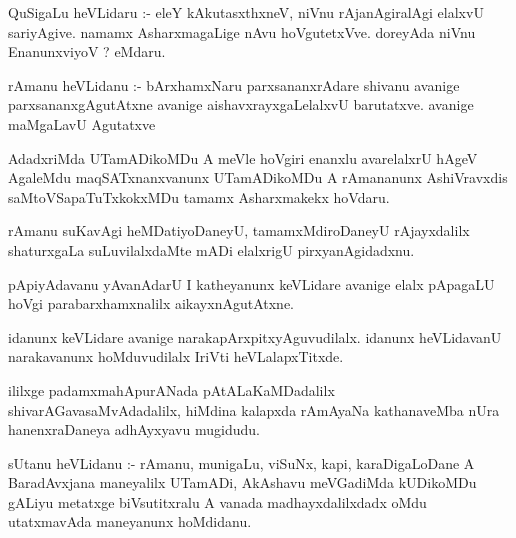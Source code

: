 \documentclass{article}
\begin{document}
\begin{mn}
QuSigaLu  heVLidaru :- eleY  kAkutasxthxneV,  niVnu  rAjanAgiralAgi  elalxvU  sariyAgive.  namamx  AsharxmagaLige  nAvu  hoVgutetxVve.  
doreyAda  niVnu  EnanunxviyoV ?  eMdaru.
\end{mn}

\begin{mn}
rAmanu  heVLidanu :- bArxhamxNaru  parxsananxrAdare  shivanu  avanige  parxsananxgAgutAtxne  avanige  aishavxrayxgaLelalxvU  barutatxve.  
avanige  maMgaLavU  Agutatxve
\end{mn}

\begin{mn}
AdadxriMda  UTamADikoMDu  A  meVle  hoVgiri  enanxlu  avarelalxrU  hAgeV  AgaleMdu  maqSATxnanxvanunx  UTamADikoMDu  A  rAmananunx  
AshiVravxdis  saMtoVSapaTuTxkokxMDu  tamamx  Asharxmakekx  hoVdaru.
\end{mn}

\begin{mn}
rAmanu  suKavAgi  heMDatiyoDaneyU,  tamamxMdiroDaneyU  rAjayxdalilx  shaturxgaLa  suLuvilalxdaMte  mADi  elalxrigU  pirxyanAgidadxnu.
\end{mn}

\begin{mn}
pApiyAdavanu  yAvanAdarU  I  katheyanunx  keVLidare  avanige  elalx  pApagaLU  hoVgi  parabarxhamxnalilx  aikayxnAgutAtxne.
\end{mn}

\begin{mn}
idanunx  keVLidare  avanige  narakapArxpitxyAguvudilalx.  idanunx  heVLidavanU  narakavanunx  hoMduvudilalx  IriVti  heVLalapxTitxde.
\end{mn}

\begin{mn}
ililxge  padamxmahApurANada  pAtALaKaMDadalilx  shivarAGavasaMvAdadalilx,  hiMdina  kalapxda  rAmAyaNa kathanaveMba  nUra  
hanenxraDaneya  adhAyxyavu  mugidudu.
\end{mn}




\begin{mn}
sUtanu  heVLidanu :- rAmanu,  munigaLu,  viSuNx,  kapi,  karaDigaLoDane  A BaradAvxjana  maneyalilx  UTamADi,  AkAshavu  meVGadiMda  
kUDikoMDu  gALiyu  metatxge  biVsutitxralu  A  vanada  madhayxdalilxdadx  oMdu  utatxmavAda  maneyanunx  hoMdidanu.
\end{mn}
\end{document}
